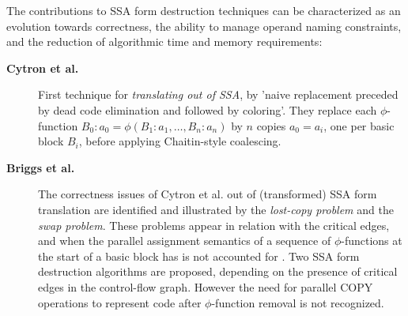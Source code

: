The contributions to SSA form destruction techniques can be characterized as an
evolution towards correctness, the ability to manage operand naming constraints,
and the reduction of algorithmic time and memory requirements:
\begin{description}

\item[\textbf{Cytron et al. \cite{Cytron:1991:TOPLAS}}] First technique for
\emph{translating out of SSA}, by 'naive replacement preceded by dead code
elimination and followed by coloring'. They replace each $\phi$-function
$B_0:a_0=\phi(B_1:a_1,\dots,B_n:a_n)$ by $n$ copies $a_0 = a_i$, one per basic
block $B_i$, before applying Chaitin-style coalescing.

\item[\textbf{Briggs et al. \cite{Briggs:1998:SPE}}] The correctness issues of
Cytron et al. \cite{Cytron:1991:TOPLAS} out of (transformed) SSA form
translation are identified and illustrated by the \emph{lost-copy problem} and the
\emph{swap problem}. These problems appear in relation with the critical edges,
and when the parallel assignment semantics of a sequence of $\phi$-functions at the
start of a basic block has is not accounted for \cite{Boissinot:2009:CGO}. Two SSA form
destruction algorithms are proposed, depending on the presence of critical edges
in the control-flow graph. However the need for parallel COPY operations to
represent code after $\phi$-function removal is not recognized.


\end{description}
